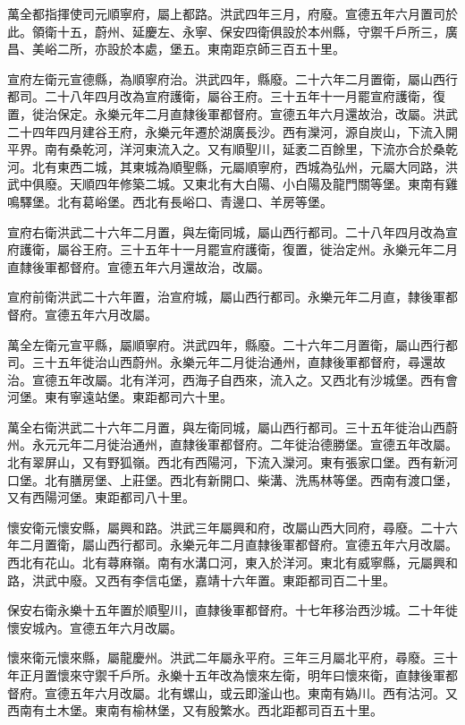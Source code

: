 萬全都指揮使司元順寧府，屬上都路。洪武四年三月，府廢。宣德五年六月置司於此。領衛十五，蔚州、延慶左、永寧、保安四衛俱設於本州縣，守禦千戶所三，廣昌、美峪二所，亦設於本處，堡五。東南距京師三百五十里。

宣府左衛元宣德縣，為順寧府治。洪武四年，縣廢。二十六年二月置衛，屬山西行都司。二十八年四月改為宣府護衛，屬谷王府。三十五年十一月罷宣府護衛，復置，徙治保定。永樂元年二月直隸後軍都督府。宣德五年六月還故治，改屬。洪武二十四年四月建谷王府，永樂元年遷於湖廣長沙。西有灤河，源自炭山，下流入開平界。南有桑乾河，洋河東流入之。又有順聖川，延袤二百餘里，下流亦合於桑乾河。北有東西二城，其東城為順聖縣，元屬順寧府，西城為弘州，元屬大同路，洪武中俱廢。天順四年修築二城。又東北有大白陽、小白陽及龍門關等堡。東南有雞鳴驛堡。北有葛峪堡。西北有長峪口、青邊口、羊房等堡。

宣府右衛洪武二十六年二月置，與左衛同城，屬山西行都司。二十八年四月改為宣府護衛，屬谷王府。三十五年十一月罷宣府護衛，復置，徙治定州。永樂元年二月直隸後軍都督府。宣德五年六月還故治，改屬。

宣府前衛洪武二十六年置，治宣府城，屬山西行都司。永樂元年二月直，隸後軍都督府。宣德五年六月改屬。

萬全左衛元宣平縣，屬順寧府。洪武四年，縣廢。二十六年二月置衛，屬山西行都司。三十五年徙治山西蔚州。永樂元年二月徙治通州，直隸後軍都督府，尋還故治。宣德五年改屬。北有洋河，西海子自西來，流入之。又西北有沙城堡。西有會河堡。東有寧遠站堡。東距都司六十里。

萬全右衛洪武二十六年二月置，與左衛同城，屬山西行都司。三十五年徙治山西蔚州。永元元年二月徙治通州，直隸後軍都督府。二年徙治德勝堡。宣德五年改屬。北有翠屏山，又有野狐嶺。西北有西陽河，下流入灤河。東有張家口堡。西有新河口堡。北有膳房堡、上莊堡。西北有新開口、柴溝、洗馬林等堡。西南有渡口堡，又有西陽河堡。東距都司八十里。

懷安衛元懷安縣，屬興和路。洪武三年屬興和府，改屬山西大同府，尋廢。二十六年二月置衛，屬山西行都司。永樂元年二月直隸後軍都督府。宣德五年六月改屬。西北有花山。北有蕁麻嶺。南有水溝口河，東入於洋河。東北有威寧縣，元屬興和路，洪武中廢。又西有李信屯堡，嘉靖十六年置。東距都司百二十里。

保安右衛永樂十五年置於順聖川，直隸後軍都督府。十七年移治西沙城。二十年徙懷安城內。宣德五年六月改屬。

懷來衛元懷來縣，屬龍慶州。洪武二年屬永平府。三年三月屬北平府，尋廢。三十年正月置懷來守禦千戶所。永樂十五年改為懷來左衛，明年曰懷來衛，直隸後軍都督府。宣德五年六月改屬。北有螺山，或云即滏山也。東南有媯川。西有沽河。又西南有土木堡。東南有榆林堡，又有殷繁水。西北距都司百五十里。

